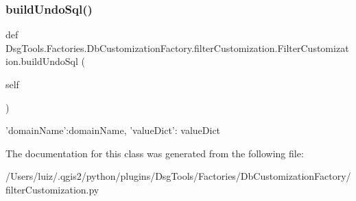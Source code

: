 \subsubsection{\texorpdfstring{build\+Undo\+Sql()}{buildUndoSql()}}
{\footnotesize\ttfamily def Dsg\+Tools.\+Factories.\+Db\+Customization\+Factory.\+filter\+Customization.\+Filter\+Customization.\+build\+Undo\+Sql (\begin{DoxyParamCaption}\item[{}]{self }\end{DoxyParamCaption})}

\begin{DoxyVerb}{'domainName':domainName, 'valueDict': valueDict}
\end{DoxyVerb}
 

The documentation for this class was generated from the following file\+:\begin{DoxyCompactItemize}
\item 
/\+Users/luiz/.\+qgis2/python/plugins/\+Dsg\+Tools/\+Factories/\+Db\+Customization\+Factory/filter\+Customization.\+py\end{DoxyCompactItemize}
